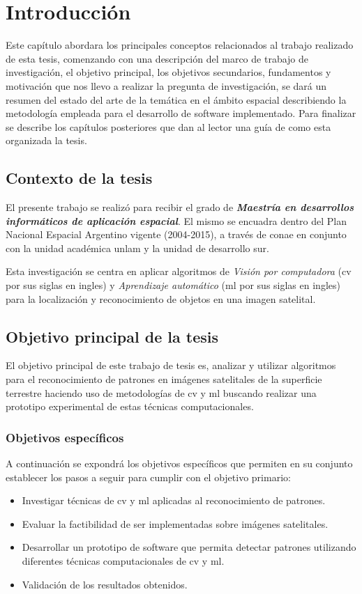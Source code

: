 \chapter{Introducción}\label{chap:introduccion}

Este capítulo abordara los principales conceptos relacionados al trabajo realizado de esta tesis, comenzando con una descripción del marco de trabajo de investigación, el objetivo principal, los objetivos secundarios, fundamentos y motivación que nos llevo a realizar la pregunta de investigación, se dará un resumen del estado del arte de la temática en el ámbito espacial describiendo la metodología empleada para el desarrollo de software implementado.  Para finalizar se describe los capítulos posteriores que dan al lector una guía de como esta organizada la tesis.


\section{Contexto de la tesis}\label{sec:contexto}
El presente trabajo se realizó para recibir el grado de \textbf{\textit{Maestría en desarrollos informáticos de aplicación espacial}}. El mismo se encuadra dentro del Plan Nacional Espacial Argentino vigente (2004-2015), a través de \ac{conae} en conjunto con la unidad académica \ac{unlam} y la unidad de desarrollo \ac{sur}.

Esta investigación se centra en aplicar  algoritmos de \textit{Visión por computadora} (\ac{cv} por sus siglas en ingles)  y \textit{Aprendizaje automático} (\ac{ml} por sus siglas en ingles) para la localización y reconocimiento de objetos en una imagen satelital.


\section{Objetivo principal de la tesis}\label{sec:obj_general}

El objetivo principal de este trabajo de tesis es, analizar y utilizar algoritmos para el  reconocimiento de patrones en imágenes satelitales de la superficie terrestre haciendo uso de metodologías de \ac{cv} y \ac{ml} buscando realizar una prototipo experimental de estas técnicas computacionales.


\subsection{Objetivos específicos }\label{sub:obj_especifico}
A continuación se expondrá los objetivos específicos que permiten en su conjunto establecer los pasos a seguir para  cumplir con el objetivo primario:
\begin{itemize}
 \item Investigar técnicas de \ac{cv} y \ac{ml} aplicadas al reconocimiento de patrones.
 \item Evaluar la factibilidad de ser implementadas sobre imágenes satelitales.
 \item Desarrollar un prototipo de software que permita detectar patrones utilizando diferentes técnicas computacionales de \ac{cv} y \ac{ml}.
 \item Validación de los resultados obtenidos.
\end{itemize}



